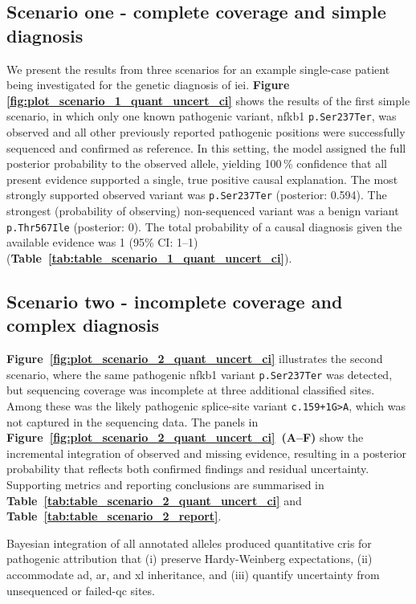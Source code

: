 \subsection{Scenario one - complete coverage and simple diagnosis}
We present the results from three scenarios for an example single-case patient being investigated for the genetic diagnosis of \ac{iei}.
\textbf{Figure \ref{fig:plot_scenario_1_quant_uncert_ci}} shows the results of the first simple scenario, in which only one known pathogenic variant, \ac{nfkb1} \texttt{p.Ser237Ter}, was observed and all other previously reported pathogenic positions were successfully sequenced and confirmed as reference. 
In this setting, the model assigned the full posterior probability to the observed allele, yielding 100\,\% confidence that all present evidence supported a single, true positive causal explanation. 
The most strongly supported observed variant was \texttt{p.Ser237Ter} (posterior: 0.594). 
The strongest (probability of observing) non-sequenced variant was a benign variant \texttt{p.Thr567Ile} (posterior: 0). 
The total probability of a causal diagnosis given the available evidence was 1 (95\% CI: 1--1) (\textbf{Table~\ref{tab:table_scenario_1_quant_uncert_ci}}). 

\subsection{Scenario two - incomplete coverage and complex diagnosis}

\textbf{Figure~\ref{fig:plot_scenario_2_quant_uncert_ci}} illustrates the second scenario, where the same pathogenic \ac{nfkb1} variant \texttt{p.Ser237Ter} was detected, but sequencing coverage was incomplete at three additional classified sites. Among these was the likely pathogenic splice-site variant \texttt{c.159+1G{\small\textgreater}A}, which was not captured in the sequencing data. The panels in \textbf{Figure~\ref{fig:plot_scenario_2_quant_uncert_ci}~(A–F)} show the incremental integration of observed and missing evidence, resulting in a posterior probability that reflects both confirmed findings and residual uncertainty. Supporting metrics and reporting conclusions are summarised in \textbf{Table~\ref{tab:table_scenario_2_quant_uncert_ci}} and \textbf{Table~\ref{tab:table_scenario_2_report}}.

Bayesian integration of all annotated alleles produced quantitative \ac{cri}s for pathogenic attribution that (i) preserve Hardy-Weinberg expectations, (ii) accommodate \ac{ad}, \ac{ar}, and \ac{xl} inheritance, and (iii) quantify uncertainty from unsequenced or failed-\ac{qc} sites.

